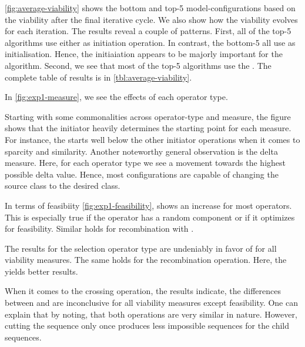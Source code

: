 \documentclass[./../../paper.tex]{subfiles}
\begin{document}
\autoref{fig:average-viability} shows the bottom and top-5 model-configurations based on the viability after the final iterative cycle. We also show how the viability evolves for each iteration. The results reveal a couple of patterns. 
First, all of the top-5 algorithms use either  as initiation operation. In contrast, the bottom-5 all use  as initialisation. Hence, the initiaiation appears to be majorly important for the algorithm.
Second, we see that most of the top-5 algorithms use the . The complete table of results is in \autoref{tbl:average-viability}.





In \autoref{fig:exp1-measure}, we see the effects of each operator type. 

Starting with some commonalities across operator-type and measure, the figure shows that the initiator heavily determines the starting point for each measure. For instance, the  starts well below the other initiator operations when it comes to sparcity and similarity. 
Another noteworthy general observation is the delta measure. Here, for each operator type we see a movement towards the highest possible delta value. Hence, most configurations are capable of changing the source class to the desired class. 

In terms of feasibiity \autoref{fig:exp1-feasibility}, shows an increase for most operators. This is especially true if the operator has a random component or if it optimizes for feasibility. Similar holds for recombination with .

The results for the selection operator type are undeniably in favor of  for all viability measures. The same holds for the recombination operation. Here, the  yields better results.

When it comes to the crossing operation, the results indicate, the differences between  and  are inconclusive for all viability measures except feasibility. One can explain that by noting, that both operations are very similar in nature. However, cutting the sequence only once produces less impossible sequences for the child sequences.
\end{document}
